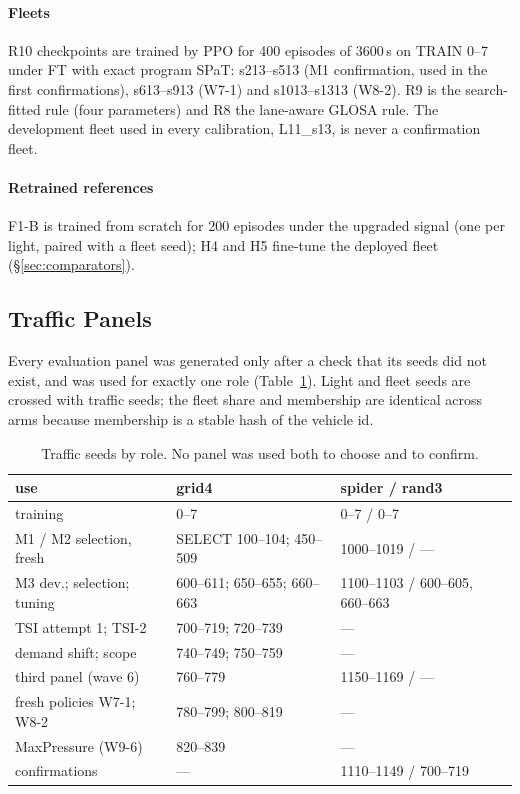\paragraph{Fleets} R10 checkpoints are trained by PPO for 400 episodes of 3600\,s on TRAIN 0--7 under FT with exact program SPaT: s213--s513
(M1 confirmation, used in the first confirmations), s613--s913 (W7-1) and s1013--s1313 (W8-2). R9 is the search-fitted rule
(four parameters) and R8 the lane-aware GLOSA rule. The development fleet used in every calibration, L11\_s13, is never a confirmation
fleet.
\paragraph{Retrained references} F1-B is trained from scratch for 200 episodes under the upgraded signal (one per light, paired with a
fleet seed); H4 and H5 fine-tune the deployed fleet (§\ref{sec:comparators}).

\subsection{Traffic Panels}
Every evaluation panel was generated only after a check that its seeds did not exist, and was used for exactly one role
(Table~\ref{tab:panels}). Light and fleet seeds are crossed with traffic seeds; the fleet share and membership are identical across arms
because membership is a stable hash of the vehicle id.
\begin{table}[t]\centering\footnotesize\setlength{\tabcolsep}{2.5pt}
\caption{Traffic seeds by role. No panel was used both to choose and to confirm.}\label{tab:panels}\scriptsize
\begin{tabular}{@{}p{2.45cm}p{2.75cm}p{2.95cm}@{}}\toprule
use & grid4 & spider / rand3\\\midrule
training & 0--7 & 0--7 / 0--7\\
M1 / M2 selection, fresh & SELECT 100--104; 450--509 & 1000--1019 / ---\\
M3 dev.; selection; tuning & 600--611; 650--655; 660--663 & 1100--1103 / 600--605, 660--663\\
TSI attempt 1; TSI-2 & 700--719; 720--739 & ---\\
demand shift; scope & 740--749; 750--759 & ---\\
third panel (wave 6) & 760--779 & 1150--1169 / ---\\
fresh policies W7-1; W8-2 & 780--799; 800--819 & ---\\
MaxPressure (W9-6) & 820--839 & ---\\
confirmations & --- & 1110--1149 / 700--719\\\bottomrule
\end{tabular}\end{table}

